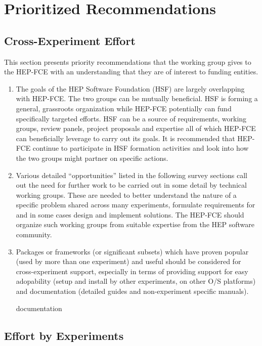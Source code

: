 \section{Prioritized Recommendations}

\subsection{Cross-Experiment Effort}

This section presents priority recommendations that the working group
gives to the HEP-FCE with an understanding that they are of interest
to funding entities.

\begin{enumerate}
\item The goals of the HEP Software Foundation\cite{hsfweb} (HSF) are
  largely overlapping with HEP-FCE.  The two groups can be mutually
  beneficial.  HSF is forming a general, grassroots organization while
  HEP-FCE potentially can fund specifically targeted efforts.  HSF can
  be a source of requirements, working groups, review panels, project
  proposals and expertise all of which HEP-FCE can beneficially
  leverage to carry out its goals.  It is recommended that HEP-FCE
  continue to participate in HSF formation activities and look into
  how the two groups might partner on specific actions.

\item Various detailed ``opportunities'' listed in the following
  survey sections call out the need for further work to be carried out
  in some detail by technical working groups. These are needed to
  better understand the nature of a specific problem shared across
  many experiments, formulate requirements for and in some cases
  design and implement solutions.  The HEP-FCE should organize such
  working groups from suitable expertise from the HEP software community.

\item Packages or frameworks (or significant subsets) which have proven 
popular (used by more than one experiment) and useful should be considered for
cross-experiment support, especially in terms of providing support for
easy adopability (setup and install by other experiments, on other 
O/S platforms) and documentation (detailed guides and non-experiment
specific manuals).

documentation

\end{enumerate}


\subsection{Effort by Experiments}

